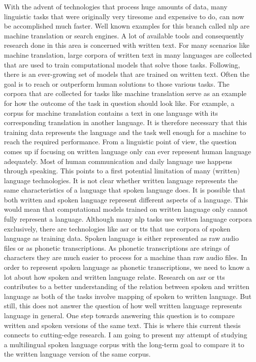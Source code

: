 
\label{chap:1_intro}

With the advent of technologies that process huge amounts of data, many linguistic tasks that were originally very tiresome and expensive to do, can now be accomplished much faster. Well known examples for this branch called \ac{nlp} are machine translation or search engines. A lot of available tools and consequently research done in this area is concerned with written text. For many scenarios like machine translation, large corpora of written text in many languages are collected that are used to train computational models that solve those tasks. Following, there is an ever-growing set of models that are trained on written text. Often the goal is to reach or outperform human solutions to those various tasks. The corpora that are collected for tasks like machine translation serve as an example for how the outcome of the task in question should look like. For example, a corpus for machine translation contains a text in one language with its corresponding translation in another language. It is therefore necessary that this training data represents the language and the task well enough for a machine to reach the required performance. From a linguistic point of view, the question comes up if focusing on written language only can ever represent human language adequately. Most of human communication and daily language use happens through speaking. This points to a first potential limitation of many (written) language technologies. It is not clear whether written language represents the same characteristics of a language that spoken language does. It is possible that both written and spoken language represent different aspects of a language. This would mean that computational models trained on written language only cannot fully represent a language. Although many \ac{nlp} tasks use written language corpora exclusively, there are technologies like \ac{asr} or \ac{tts} that use corpora of spoken language as training data. Spoken language is either represented as raw audio files or as phonetic transcriptions. As phonetic transcriptions are strings of characters they are much easier to process for a machine than raw audio files. In order to represent spoken language as phonetic transcriptions, we need to know a lot about how spoken and written language relate. Research on \ac{asr} or \ac{tts} contributes to a better understanding of the relation between spoken and written language as both of the tasks involve mapping of spoken to written language. But still, this does not answer the question of how well written language represents language in general. One step towards answering this question is to compare written and spoken versions of the same text. This is where this current thesis connects to cutting-edge research. I am going to present my attempt of studying a multilingual spoken language corpus with the long-term goal to compare it to the written language version of the same corpus. 


